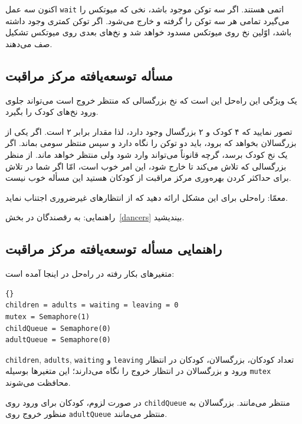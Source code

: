 \documentclass{book}
\newcommand{\clearemptydoublepage}{}%
\begin{document}
    اکنون سه عمل {\tt wait} اتمی هستند. اگر سه توکن موجود باشد، نخی که میوتکس را می‌گیرد تمامی هر سه توکن را گرفته و خارج می‌شود. 
    اگر  توکن کمتری وجود داشته باشد، اوّلین نخ روی میوتکس مسدود خواهد شد و نخ‌های بعدی روی میوتکس تشکیل صف می‌دهند. 

\subsection {مسأله توسعه‌یافته مرکز مراقبت}

    یک ویژگی این راه‌حل این است که نخ بزرگسالی که منتظر خروج است می‌تواند جلوی ورود نخ‌های کودک را بگیرد. 

    تصور نمایید که ۴ کودک و ۲ بزرگسال وجود دارد، لذا مقدار  برابر ۲ است. اگر یکی از بزرگسالان بخواهد که برود، باید دو توکن 
    را نگاه دارد و سپس منتظر سومی بماند. اگر یک نخ کودک برسد، گرچه قانوناً می‌تواند وارد شود ولی منتظر خواهد ماند. 
    از منظر بزرگسالی که تلاش می‌کند تا خارج شود، این امر خوب است، امّا اگر شما در تلاش برای حداکثر کردن بهره‌وری مرکز مراقبت از کودکان هستید 
    این مسأله خوب نیست. 

    معمّا: راه‌حلی برای این مشکل ارائه دهید که از انتظارهای غیرضروری اجتناب نماید. 

    راهنمایی: به رقصندگان در بخش~\ref{dancers} بیندیشید. 



\clearemptydoublepage
\subsection {راهنمایی مسأله توسعه‌یافته مرکز مراقبت}

    متغیرهای بکار رفته در راه‌حل در اینجا آمده است:

\begin{latin}
\begin{lstlisting}[title=\rl{راهنمایی مسأله توسعه‌یافته مرکز مراقبت}]{}
children = adults = waiting = leaving = 0
mutex = Semaphore(1)
childQueue = Semaphore(0)
adultQueue = Semaphore(0)
\end{lstlisting}
\end{latin}

{\tt children}, {\tt adults}, {\tt waiting} و {\tt leaving}
    تعداد کودکان، بزرگسالان، کودکان در انتظار ورود و بزرگسالان در انتظار خروج را نگاه می‌دارند؛ این متغیرها بوسیله {\tt mutex} محافظت می‌شوند. 

    در صورت لزوم،  کودکان  برای ورود  روی {\tt childQueue}  منتظر می‌مانند. 
    بزرگسالان به منظور خروج روی  {\tt adultQueue}  منتظر می‌مانند. 
\end{document}
